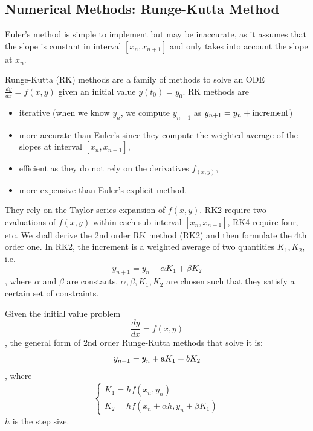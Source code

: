 \documentclass[a4paper]{article}
\begin{document}
\subsection{Numerical Methods: Runge-Kutta Method}

Euler's method is simple to implement but may be inaccurate, as it assumes that the slope is constant in interval $[x_n, x_{n+1}]$ and only takes into account the slope at $x_n$.

Runge-Kutta (RK) methods are a family of methods to solve an ODE $\tfrac{dy}{dx} = f(x,y)$ given an initial value $y(t_0)=y_0$. RK methods are
\begin{itemize}
    \item iterative (when we know $y_n$, we compute $y_{n+1}$ as $y_{n+1} = y_n + \textup{increment}$)
    \item more accurate than Euler's  since they compute the weighted average of the slopes at interval $[x_n, x_{n+1}]$,
    \item efficient as they do not rely on the derivatives $f_(x,y)$,
    \item more expensive than Euler's explicit method.
\end{itemize}
They rely on the Taylor series expansion of $f(x,y)$. RK2 require two evaluations of $f(x,y)$ within each sub-interval $[x_n, x_{n+1}]$, RK4 require four, etc. We shall derive the 2nd order RK method (RK2) and then formulate the 4th order one. In RK2, the increment is a weighted average of two quantities $K_1, K_2$, i.e.
\[
y_{n+1} = y_n + \alpha K_1 + \beta K_2
\]
, where $\alpha$ and $\beta$ are constants. $\alpha, \beta, K_1, K_2$ are chosen such that they satisfy a certain set of constraints.
\begin{definition}
Given the initial value problem
\[
\frac{dy}{dx} = f(x,y)
\]
, the general form of 2nd order Runge-Kutta methods that solve it is:
\begin{equation}
    y_{n+1} = y_n + \textup{a} K_1 + b K_2
\end{equation}
, where
\begin{equation}
    \left \{
        \begin{array}{l}
             K_1 = h f(x_n, y_n)  \\
             K_2 = h f(x_n + \alpha h, y_n + \beta K_1)
        \end{array}
    \right.
\end{equation}
$h$ is the step size.
\end{definition}
\end{document}
